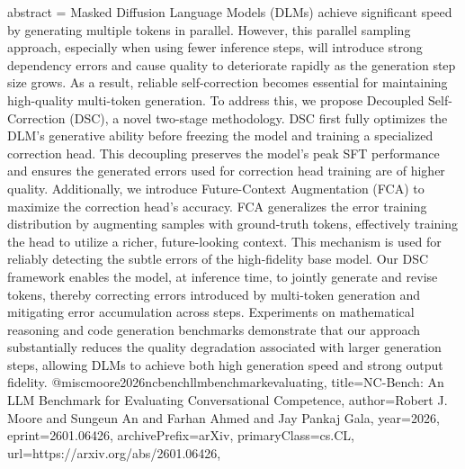 {      abstract = {Masked Diffusion Language Models (DLMs) achieve significant speed by generating multiple tokens in parallel. However, this parallel sampling approach, especially when using fewer inference steps, will introduce strong dependency errors and cause quality to deteriorate rapidly as the generation step size grows. As a result, reliable self-correction becomes essential for maintaining high-quality multi-token generation. To address this, we propose Decoupled Self-Correction (DSC), a novel two-stage methodology. DSC first fully optimizes the DLM's generative ability before freezing the model and training a specialized correction head. This decoupling preserves the model's peak SFT performance and ensures the generated errors used for correction head training are of higher quality. Additionally, we introduce Future-Context Augmentation (FCA) to maximize the correction head's accuracy. FCA generalizes the error training distribution by augmenting samples with ground-truth tokens, effectively training the head to utilize a richer, future-looking context. This mechanism is used for reliably detecting the subtle errors of the high-fidelity base model. Our DSC framework enables the model, at inference time, to jointly generate and revise tokens, thereby correcting errors introduced by multi-token generation and mitigating error accumulation across steps. Experiments on mathematical reasoning and code generation benchmarks demonstrate that our approach substantially reduces the quality degradation associated with larger generation steps, allowing DLMs to achieve both high generation speed and strong output fidelity.}
}@misc{moore2026ncbenchllmbenchmarkevaluating,
      title={NC-Bench: An LLM Benchmark for Evaluating Conversational Competence}, 
      author={Robert J. Moore and Sungeun An and Farhan Ahmed and Jay Pankaj Gala},
      year={2026},
      eprint={2601.06426},
      archivePrefix={arXiv},
      primaryClass={cs.CL},
      url={https://arxiv.org/abs/2601.06426},
}
